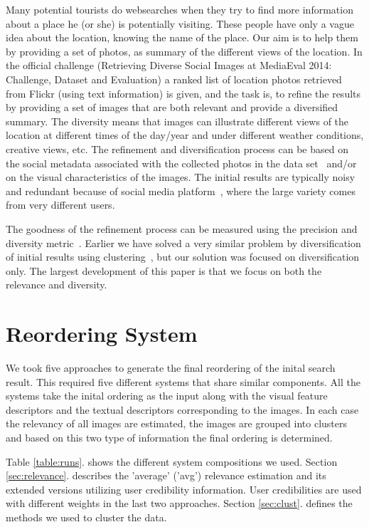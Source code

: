 \documentclass{acm_proc_article-me}
\begin{document}
Many potential tourists do websearches when they try to find more information about a place he (or she) is potentially visiting. These people have only a vague idea about the location, knowing the name of the place. Our aim is to help them by providing a set of photos, as summary of the different views of the location. 
In the official challenge (Retrieving Diverse Social Images at MediaEval 2014: Challenge, Dataset and Evaluation) \cite{ionescu2014retrieving} a ranked list of location photos retrieved from Flickr (using text information) is given, and the task is, to refine the results by providing a set of images that are both relevant and provide a diversified summary. The diversity means that images can illustrate different views of the location at different times of the day/year and under different weather conditions, creative views, etc. The refinement and diversification process can be based on the social metadata associated with the collected photos in the data set~\cite{ionescu2014div400} and/or on the visual characteristics of the images. The initial results are typically noisy and redundant because of social media platform~\cite{radu2014hybrid}, where the large variety comes from very different users. 

The goodness of the refinement process can be measured using the precision and diversity metric~\cite{Taneva:2010:GRP:1718487.1718541}. Earlier we have solved a very similar problem by diversification of initial results using clustering~\cite{szHucs2013bmemtm}, but our solution was focused on diversification only. The largest development of this paper is that we focus on both the relevance and diversity.

\section{Reordering System}

We took five approaches to generate the final reordering of the inital search result. This required five different systems that share similar components. All the systems take the inital ordering as the input along with the visual feature descriptors and the textual descriptors corresponding to the images. In each case the relevancy of all images are estimated, the images are grouped into clusters and based on this two type of information the final ordering is determined.

Table \ref{table:runs}. shows the different system compositions we used. Section \ref{sec:relevance}. describes the 'average' ('avg') relevance estimation and its extended versions utilizing user credibility information. User credibilities are used with different weights in the last two approaches. Section \ref{sec:clust}. defines the methods we used to cluster the data.
\end{document}
